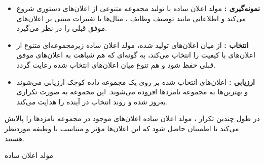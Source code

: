 \begin{itemize}[noitemsep]
	\item \textbf{نمونه‌گیری
		:} مولد اعلان ساده با تولید مجموعه متنوعی از اعلان‌های دستوری شروع می‌کند و اطلاعاتی مانند توصیف وظایف
		، مثال‌ها یا تغییرات مبتنی بر اعلان‌های موفق قبلی را در نظر می‌گیرد.
	\item \textbf{انتخاب
		:} از میان اعلان‌های تولید شده، مولد اعلان ساده زیرمجموعه‌ای متنوع از اعلان‌های با کیفیت را انتخاب می‌کند، به گونه‌ای که هم شباهت به اعلان‌های موفق قبلی حفظ شود و هم تنوع میان اعلان‌های انتخاب شده رعایت گردد.
	\item \textbf{ارزیابی
		:} اعلان‌های انتخاب شده بر روی یک مجموعه‌ داده کوچک ارزیابی می‌شوند و بهترین‌ها به مجموعه نامزدها 
	افزوده می‌شوند. این مجموعه به صورت تکراری به‌روز شده و روند انتخاب در آینده را هدایت می‌کند.
\end{itemize}
در طول چندین تکرار
، مولد اعلان ساده اعلان‌های موجود در مجموعه نامزدها را پالایش می‌کند تا اطمینان حاصل شود که این اعلان‌ها مؤثر و متناسب با وظیفه موردنظر هستند.



\begin{algorithm}[h]
	\caption{مولد اعلان ساده}
	\label{alg_simple_prompt_breeder}
\end{algorithm}



